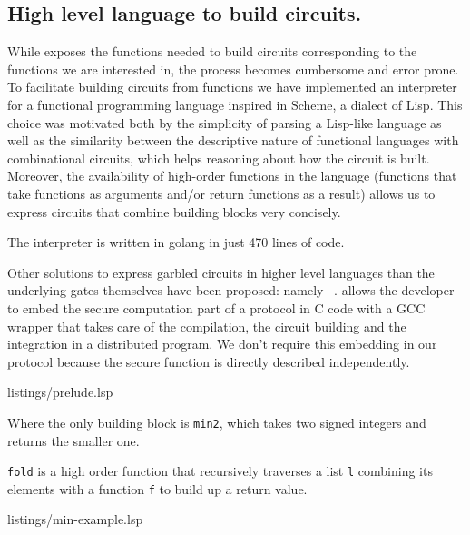 \subsection{High level language to build circuits.}

While \libgarble{} exposes the functions needed to build circuits corresponding
to the functions we are interested in, the process becomes cumbersome and error
prone.  To facilitate building circuits from functions we have implemented an
interpreter for a functional programming language inspired in Scheme, a dialect
of Lisp.  This choice was motivated both by the simplicity of parsing a
Lisp-like language as well as the similarity between the descriptive nature of
functional languages with combinational circuits, which helps reasoning about
how the circuit is built.  Moreover, the availability of high-order functions
in the language (functions that take functions as arguments and/or return
functions as a result) allows us to express circuits that combine building
blocks very concisely.

The interpreter is written in golang in just 470 lines of code.

Other solutions to express garbled circuits in higher level languages than the
underlying gates themselves have been proposed: namely \OblivC{}~\cite{oblivc}.
\OblivC{} allows the developer to embed the secure computation part of a
protocol in C code with a GCC wrapper that takes care of the compilation, the
circuit building and the integration in a distributed program.  We don't
require this embedding in our protocol because the secure function is directly
described independently.

\noindent
\begin{minipage}{\linewidth}

{listings/prelude.lsp}
\end{minipage}

Where the only \libgarble{} building block is \texttt{min2}, which takes two
signed integers and returns the smaller one.

\texttt{fold} is a high order function that recursively traverses a list
\texttt{l} combining its elements with a function \texttt{f} to build up a
return value.

\noindent
\begin{minipage}{\linewidth}

{listings/min-example.lsp}
\end{minipage}

